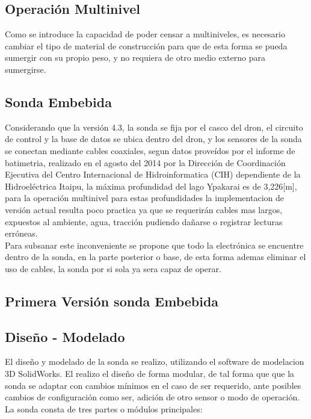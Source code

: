 \subsection{Operación Multinivel}
Como se introduce la capacidad de poder censar a multiniveles, es necesario cambiar el tipo de material de construcción para que de esta forma se pueda sumergir con su propio peso, y no requiera de otro medio externo para sumergirse. 
\subsection{Sonda Embebida}
Considerando que la versión 4.3, la sonda se fija por el casco del dron, el circuito de control y la base de datos se ubica dentro del dron, y los sensores de la sonda se conectan mediante cables coaxiales, segun datos proveídos por el informe de batimetria, realizado en el agosto del 2014  por la Dirección de Coordinación Ejecutiva del Centro Internacional de Hidroinformatica (CIH) dependiente de la Hidroeléctrica Itaipu, la máxima profundidad del lago Ypakarai es de 3,226[m], para la operación multinivel para estas profundidades la implementacion de versión actual resulta poco practica ya que se requerirán cables mas largos, expuestos al ambiente, agua, tracción pudiendo dañarse o registrar lecturas erróneas.\\ Para subsanar este inconveniente se propone que todo la electrónica se encuentre dentro de la sonda, en la parte posterior o base, de esta forma ademas eliminar el uso de cables, la sonda por si sola ya sera capaz de operar.

\subsection{Primera Versi\'on sonda Embebida}

\subsection{Diseño - Modelado}
El dise\~no y modelado de la sonda se realizo, utilizando el software de modelacion 3D SolidWorks.
El realizo el diseño de forma modular, de tal forma que que la sonda se adaptar con cambios mínimos en el caso de ser requerido, ante posibles cambios de configuración como ser, adición de otro sensor o modo de operación.    
La sonda consta de tres partes o módulos principales:

